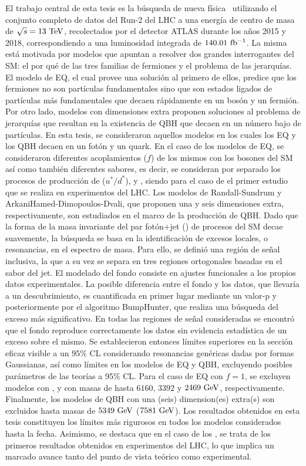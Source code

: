 El trabajo central de esta tesis es la búsqueda de nueva física~\cite{ATLAS-PhotonJetResonances-Run2-NOTE} utilizando el conjunto completo de datos del Run-2 del \ac{LHC} a una energía de centro de masa de \(\sqs = 13~\TeV\), recolectados por el detector \ac{ATLAS} durante los años 2015 y 2018, correspondiendo a una luminosidad integrada de \(140.01~\ifb\). La misma está motivada por modelos que apuntan a resolver dos grandes interrogantes del \ac{SM}: el por qué de las tres familias de fermiones y el problema de las jerarquías. El modelo de \acf{EQ}, el cual provee una solución al primero de ellos, predice que los fermiones no son partículas fundamentales sino que son estados ligados de partículas más fundamentales que decaen rápidamente en un bosón y un fermión. Por otro lado, modelos con dimensiones extra proponen soluciones al problema de jerarquías que resultan en la existencia de \acf{QBH} que decaen en un número bajo de partículas. En esta tesis, se consideraron aquellos modelos en los cuales los \ac{EQ} y los \ac{QBH} decaen en un fotón y un quark. En el caso de los modelos de \ac{EQ}, se consideraron diferentes acoplamientos (\(f\)) de los mismos con los bosones del \ac{SM} así como también diferentes sabores, es decir, se consideran por separado los procesos de producción de \qstar (\(u^*/d^*\)), \cstar y \bstar, siendo para el caso de \cstar el primer estudio que se realiza en experimentos del \ac{LHC}. Los modelos de Randall-Sundrum y ArkaniHamed-Dimopoulos-Dvali, que proponen una y seis dimensiones extra, respectivamente, son estudiados en el marco de la producción de \ac{QBH}. Dado que la forma de la masa invariante del par fotón+jet (\myj) de procesos del \ac{SM} decae suavemente, la búsqueda se basa en la identificación de excesos locales, o resonancias, en el espectro de masa. Para ello, se definió una región de señal inclusiva, la que a su vez se separa en tres regiones ortogonales basadas en el sabor del jet. El modelado del fondo consiste en ajustes funcionales a los propios datos experimentales. La posible diferencia entre el fondo y los datos, que llevaría a un descubrimiento, es cuantificada en primer lugar mediante un valor-p y posteriormente por el algoritmo BumpHunter, que realiza una búsqueda del exceso más significativo. En todas las regiones de señal consideradas se encontró que el fondo reproduce correctamente los datos sin evidencia estadística de un exceso sobre el mismo. Se establecieron entonces límites superiores en la sección eficaz visible a un \(95\%\) \ac{CL} considerando resonancias genéricas dadas por formas Gaussianas, así como límites en los modelos de \ac{EQ} y \ac{QBH}, excluyendo posibles parámetros de las teorías a 95\% \ac{CL}. Para el caso de \ac{EQ} con \(f = 1\), se excluyen modelos con \qstar, \cstar y \bstar con masas de hasta \(6160\), \(3392\) y \(2469~\GeV\), respectivamente. Finalmente, los modelos de \ac{QBH} con una (seis) dimension(es) extra(s) son excluidos hasta masas de \(5349~\GeV\) (\(7581~\GeV\)). Los resultados obtenidos en esta tesis constituyen los límites más rigurosos en todos los modelos considerados hasta la fecha. Asimismo, se destaca que en el caso de los \cstar, se trata de los primeros resultados obtenidos en experimentos del \ac{LHC}, lo que implica un marcado avance tanto del punto de vista teórico como experimental.